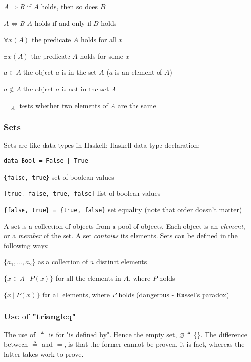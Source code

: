 \documentclass[a4paper, 12pt]{article}
\begin{document}
                $A \Rightarrow B$ \hfill if $A$ holds, then so does $B$
                \smallskip

                $A \Leftrightarrow B$ \hfill $A$ holds if and only if $B$ holds
                \smallskip

                $\forall x (A)$ \hfill the predicate $A$ holds for all $x$
                \smallskip

                $\exists x (A)$ \hfill the predicate $A$ holds for some $x$
                \smallskip

                $a \in A$ \hfill the object $a$ is in the set $A$ ($a$ is an element of $A$)
                \smallskip

                $a \notin A$ \hfill the object $a$ is not in the set $A$
                \smallskip

                $=_A$ \hfill tests whether two elements of $A$ are the same
            \subsubsection*{Sets}
                Sets are like data types in Haskell: Haskell data type declaration;
                \medskip

                \texttt{data Bool = False | True}
                \smallskip

                \texttt{\{false, true\}} \hfill set of boolean values
                \smallskip

                \texttt{[true, false, true, false]} \hfill list of boolean values
                \smallskip

                \texttt{\{false, true\} = \{true, false\}} \hfill set equality (note that order doesn't matter)
                \medskip

                A set is a collection of objects from a pool of objects. Each object is an \textit{element}, or a \textit{member} of the set. A set \textit{contains} its elements. Sets can be defined in the following ways;
                \medskip

                $\{a_1, ..., a_2\}$ \hfill as a collection of $n$ distinct elements
                \smallskip

                $\{x \in A\ |\ P(x)\}$ \hfill for all the elements in $A$, where $P$ holds
                \smallskip

                $\{x\ |\ P(x)\}$ \hfill for all elements, where $P$ holds (dangerous - Russel's paradox)
            \subsubsection*{Use of "triangleq"}
                The use of $\triangleq$ is for "is defined by". Hence the empty set, $\varnothing \triangleq \{\}$. The difference between $\triangleq$ and $=$, is that the former cannot be proven, it is fact, whereas the latter takes work to prove.
\end{document}
